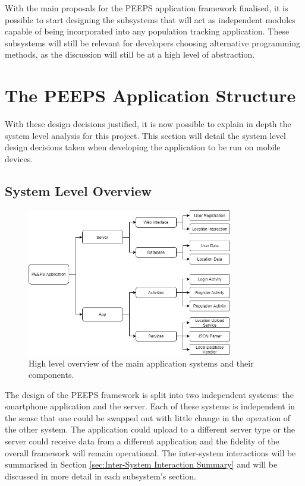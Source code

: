 With the main proposals for the PEEPS application framework finalised, it is possible to start designing the subsystems that will act as independent modules capable of being incorporated into any population tracking application. These subsystems will still be relevant for developers choosing alternative programming methods, as the discussion will still be at a high level of abstraction. 

\section{The PEEPS Application Structure}
With these design decisions justified, it is now possible to explain in depth the system level analysis for this project. This section will detail the system level design decisions taken when developing the application to be run on mobile devices.
\subsection{System Level Overview}

\begin{figure}[ht]
\centering
\includegraphics[width=0.8\textwidth]{figures/SystemHighLevel.png}
\caption{High level overview of the main application systems and their components.}
\label{fig:system_high_level}
\end{figure}

The design of the PEEPS framework is split into two independent systems: the smartphone application and the server. Each of these systems is independent in the sense that one could be swapped out with little change in the operation of the other system. The application could upload to a different server type or the server could receive data from a different application and the fidelity of the overall framework will remain operational. The inter-system interactions will be summarised in Section \ref{sec:Inter-System Interaction Summary} and will be discussed in more detail in each subsystem's section.

